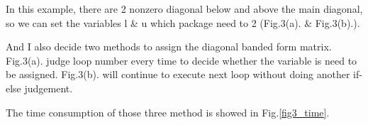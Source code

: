 \documentclass{article}
\begin{document}
In this example, there are 2 nonzero diagonal below and above the main diagonal, so we can set the variables l \& u which package need to 2 (Fig.3(a). \& Fig.3(b).).

And I also decide two methods to assign the diagonal banded form matrix.  Fig.3(a). judge loop number every time to decide whether the variable is need to be assigned.
Fig.3(b). will continue to execute next loop without doing another if-else judgement.

The time consumption of those three method is showed in Fig.\ref{fig3_time}.\\ \\
\begin{figure}[]
    \centering
\end{figure}
\end{document}
